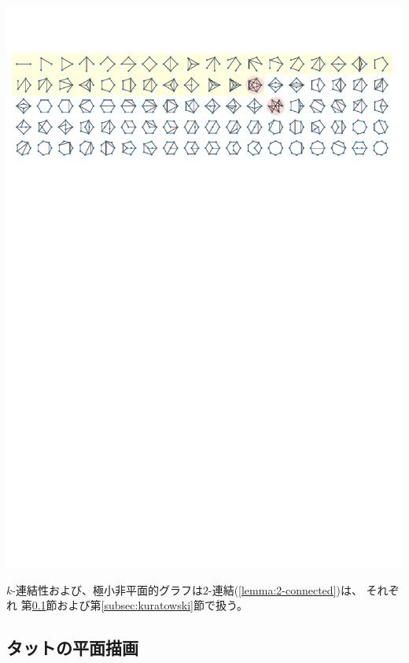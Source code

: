 \noindent
\includegraphics[width=1.0\textwidth]{figures/simple_graphs2.pdf}

\vspace{0.5\intextsep}

$k$-連結性および、極小非平面的グラフは$2$-連結(\cref{lemma:2-connected})は、
それぞれ
第\ref{subsec:tutte}節および第\ref{subsec:kuratowski}節で扱う。



\subsection{タットの平面描画}\label{subsec:tutte}

